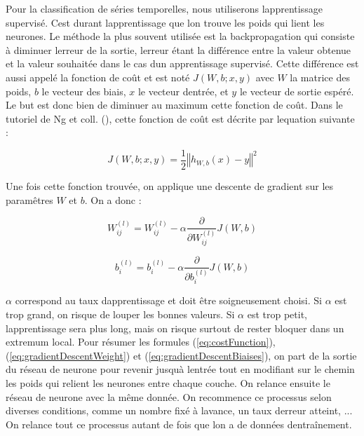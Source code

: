 \documentclass[11pt]{sdm}
\begin{document}
			Pour la classification de s\'eries temporelles, nous utiliserons l\textquotesingle apprentissage supervis\'e.
			C\textquotesingle est durant l\textquotesingle apprentissage que l\textquotesingle on trouve les poids qui lient les neurones. Le m\'ethode la plus souvent utilis\'ee est la backpropagation qui consiste \`a diminuer l\textquotesingle erreur de la sortie, l\textquotesingle erreur \'etant la diff\'erence entre la valeur obtenue et la valeur souhait\'ee dans le cas d\textquotesingle un apprentissage supervis\'e. Cette diff\'erence est aussi appel\'e la fonction de co\^ut et est not\'e $J(W,b;x,y)$ avec $W$ la matrice des poids, $b$ le vecteur des biais, $x$ le vecteur d\textquotesingle entr\'ee, et $y$ le vecteur de sortie esp\'er\'e. Le but est donc bien de diminuer au maximum cette fonction de co\^ut. Dans le tutoriel de Ng et coll. (\cite{ng2012ufldl}), cette fonction de co\^ut est d\'ecrite par l\textquotesingle equation suivante :

			\begin{equation}
				J(W,b;x,y) = \frac{1}{2} {\left\Vert h_{W,b}(x) - y \right\Vert}^2
				\label{eq:costFunction}
			\end{equation}

			Une fois cette fonction trouv\'ee, on applique une descente de gradient sur les param\^etres $W$ et $b$. On a donc :

			\begin{equation}
				W_{ij}^{(l)} = W_{ij}^{(l)} - \alpha \frac{\partial}{\partial W_{ij}^{(l)}} J(W,b)
				\label{eq:gradientDescentWeight}
			\end{equation}
 
			\begin{equation}
				b_{i}^{(l)} = b_{i}^{(l)} - \alpha \frac{\partial}{\partial b_{i}^{(l)}} J(W,b)
				\label{eq:gradientDescentBiaises}
			\end{equation}

			$\alpha$ correspond au taux d\textquotesingle apprentissage et doit \^etre soigneusement choisi. Si $\alpha$ est trop grand, on risque de louper les bonnes valeurs. Si $\alpha$ est trop petit, l\textquotesingle apprentissage sera plus long, mais on risque surtout de rester bloquer dans un extremum local. Pour r\'esumer les formules (\ref{eq:costFunction}), (\ref{eq:gradientDescentWeight}) et (\ref{eq:gradientDescentBiaises}), on part de la sortie du r\'eseau de neurone pour revenir jusqu\textquotesingle \`a l\textquotesingle entr\'ee tout en modifiant sur le chemin les poids qui relient les neurones entre chaque couche. On relance ensuite le r\'eseau de neurone avec la m\^eme donn\'ee.
			On recommence ce processus selon diverses conditions, comme un nombre fix\'e \`a l\textquotesingle avance, un taux d\textquotesingle erreur atteint, ...
			On relance tout ce processus autant de fois que l\textquotesingle on a de donn\'ees d\textquotesingle entra\^inement.
\end{document}
